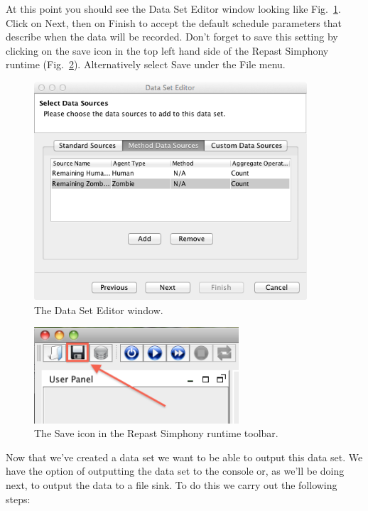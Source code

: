 \documentclass[11pt]{amsart}
\begin{document}
At this point you should see the Data Set Editor window looking like Fig.~\ref{fig:datasetcolumns}. Click on Next, then on Finish to accept the default schedule parameters that describe when the data will be recorded. Don't forget to save this setting by clicking on the save icon in the top left hand side of the Repast Simphony runtime (Fig.~\ref{fig:save}). Alternatively select Save under the File menu.

\begin{figure}
\begin{center}
\vspace{.2in}
\centerline {
\includegraphics[width=4in]{GettingStartedImages/DataSetColumns.png}
}
\caption{The Data Set Editor window.}
\label{fig:datasetcolumns}
\end{center}
\end{figure}

\begin{figure}
\begin{center}
\vspace{.2in}
\centerline {
\includegraphics[width=3in]{GettingStartedImages/Save.png}
}
\caption{The Save icon in the Repast Simphony runtime toolbar.}
\label{fig:save}
\end{center}
\end{figure}

Now that we've created a data set we want to be able to output this data set. We have the option of outputting the data set to the console or, as we'll be doing next, to output the data to a file sink. To do this we carry out the following steps:
\end{document}
